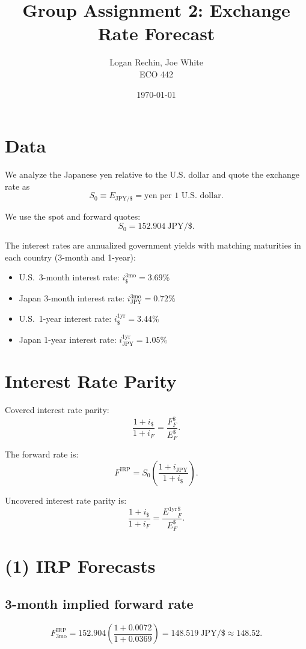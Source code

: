 \documentclass[11pt]{article}
\begin{document}
\title{Group Assignment 2: Exchange Rate Forecast}
\author{Logan Rechin, Joe White\\ECO 442}
\date{\today}
\maketitle

\section*{Data}

We analyze the Japanese yen relative to the U.S. dollar and quote the exchange rate as
\[
S_0 \equiv E_{\text{JPY}/\$} = \text{yen per 1 U.S. dollar}.
\]

We use the spot and forward quotes:
\[
S_0 = 152.904 \ \text{JPY}/\$.
\]

The interest rates are annualized government yields with matching maturities in each country (3-month and 1-year):

\begin{itemize}
  \item U.S.\ 3-month interest rate: $i_{\$}^{3\text{mo}} = 3.69\%$
  \item Japan 3-month interest rate: $i_{\text{JPY}}^{3\text{mo}} = 0.72\%$
  \item U.S.\ 1-year interest rate: $i_{\$}^{1\text{yr}} = 3.44\%$
  \item Japan 1-year interest rate: $i_{\text{JPY}}^{1\text{yr}} = 1.05\%$
\end{itemize}

\section*{Interest Rate Parity}

Covered interest rate parity:
\[
\frac{1+i_{\$}}{1+i_F} = \frac{F^{\$}_{F}}{E^{\$}_{F}}.
\]

The forward rate is:
\[
F^{\text{IRP}}
=
S_0\left(\frac{1+i_{\text{JPY}}}{1+i_{\$}}\right).
\]

Uncovered interest rate parity is:
\[
\frac{1+i_{\$}}{1+i_F} = \frac{E^{1\text{yr}}{}^{\$}_{F}}{E^{\$}_{F}}.
\]

\section*{(1) IRP Forecasts}

\subsection*{3-month implied forward rate}
\[
F_{3\text{mo}}^{\text{IRP}}
=
152.904\left(\frac{1+0.0072}{1+0.0369}\right)
=
148.519\ \text{JPY}/\$ \approx 148.52.
\]
\end{document}
